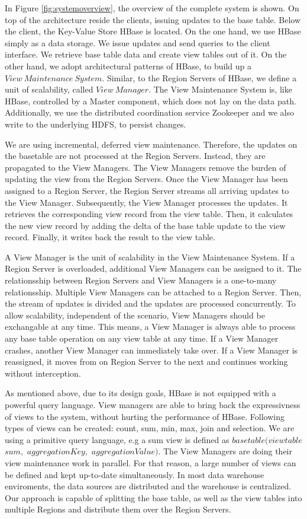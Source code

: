 \documentclass[11pt,a4paper,bibtotoc,idxtotoc,headsepline,footsepline,footexclude,BCOR12mm,DIV13]{scrbook}
\begin{document}
In Figure \ref{fig:systemoverview}, the overview of the complete system is shown. On top of the architecture reside the clients, issuing updates to the base table. Below the client, the Key-Value Store HBase is located. On the one hand, we use HBase simply as a data storage. We issue updates and send queries to the client interface. We retrieve base table data and create view tables out of it. On the other hand, we adopt  architectural patterns of HBase, to build up a $View\:Maintenance\:System$. Similar, to the Region Servers of HBase, we define a unit of scalability, called $View\:Manager$. The View Maintenance System is, like HBase, controlled by a Master component, which does not lay on the data path. Additionally, we use the distributed coordination service Zookeeper and we also write to the underlying HDFS, to persist changes.

We are using incremental, deferred view maintenance. Therefore, the updates on the basetable are not processed at the Region Servers. Instead, they are propagated to the View Managers. The View Managers remove the burden of updating the view from the Region Servers. Once the View Manager has been assigned to a Region Server, the Region Server streams all arriving updates to the View Manager. Subsequently, the View Manager processes the updates. It retrieves the corresponding view record from the view table. Then, it calculates the new view record by adding the delta of the base table update to the view record. Finally, it writes back the result to the view table.

A View Manager is the unit of scalability in the View Maintenance System. If a Region Server is overloaded, additional View Managers can be assigned to it. The relationsship between Region Servers and View Managers is a one-to-many relationsship. Multiple View Managers can be attached to a Region Server. Then, the stream of updates is divided and the updates are processed concurrently. To allow scalability, independent of the scenario, View Managers should be exchangable at any time. This means, a View Manager is always able to process any base table operation on any view table at any time. If a View Manager crashes, another View Manager can immediately take over. If a View Manager is reassigned, it moves from on Region Server to the next and continues working without interception.

As mentioned above, due to its design goals, HBase is not equipped with a powerful query language. View managers are able to bring back the expressivness of views to the system, without hurting the performance of HBase. Following types of views can be created: count, sum, min, max, join and selection. We are using a primitive query language, e.g a sum view is defined as $basetable(viewtable$ $sum,$ $aggregationKey,$ $aggregationValue)$. 
The View Managers are doing their view maintenance work in parallel. For that reason, a large number of views can be defined and kept up-to-date simultaneously. In most data warehouse enviroments, the data sources are distributed and the warehouse is centralized\cite{chen:multiversion}. Our approach is capable of splitting the base table, as well as the view tables into multiple Regions and distribute them over the Region Servers.\\   
\end{document}
